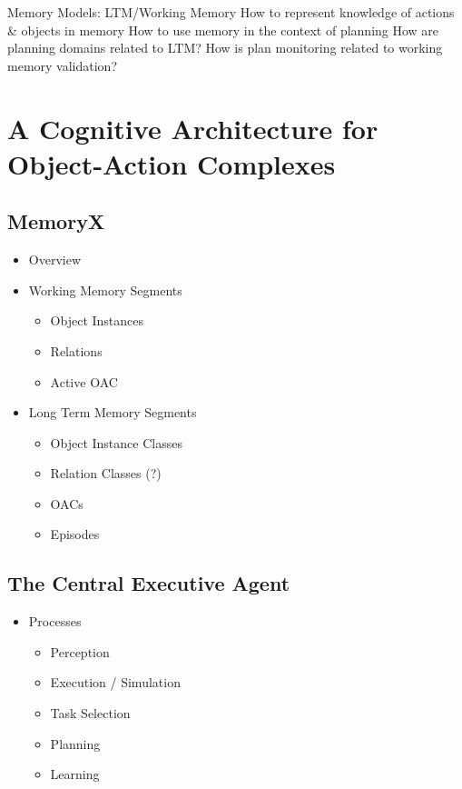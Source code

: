 \documentclass[english,ngerman]{KITreprt}
\begin{document}
Memory Models: LTM/Working Memory
How to represent knowledge of actions \& objects in memory
How to use memory in the context of planning
How are planning domains related to LTM?
How is plan monitoring related to working memory validation?

\chapter{A Cognitive Architecture for Object-Action Complexes}

\section{MemoryX}
\begin{itemize}
    \item Overview
    \item Working Memory Segments
        \begin{itemize}
            \item Object Instances
            \item Relations
            \item Active OAC
        \end{itemize}
    \item Long Term Memory Segments
        \begin{itemize}
            \item Object Instance Classes
            \item Relation Classes (?)
            \item OACs
            \item Episodes
        \end{itemize}
\end{itemize}

\section{The Central Executive Agent}
\begin{itemize}
    \item Processes
        \begin{itemize}
            \item Perception
            \item Execution / Simulation
            \item Task Selection
            \item Planning
            \item Learning
        \end{itemize}
\end{itemize}
\end{document}
